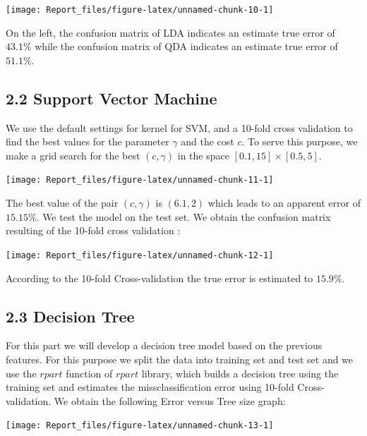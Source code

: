 \documentclass[]{article}
\begin{document}
\begin{center}\texttt{[image: Report\_files/figure-latex/unnamed-chunk-10-1]} \end{center}

On the left, the confusion matrix of LDA indicates an estimate true
error of \(43.1\%\) while the confusion matrix of QDA indicates an
estimate true error of \(51.1\%\).

\subsection{2.2 Support Vector Machine}\label{support-vector-machine}

We use the default settings for kernel for SVM, and a 10-fold cross
validation to find the best values for the parameter \(\gamma\) and the
cost \(c\). To serve this purpose, we make a grid search for the best
\((c,\gamma)\) in the space \([0.1,15] \times [0.5,5]\).

\begin{center}\texttt{[image: Report\_files/figure-latex/unnamed-chunk-11-1]} \end{center}

The best value of the pair \((c,\gamma)\) is \((6.1,2)\) which leads to
an apparent error of \(15.15\%\). We test the model on the test set. We
obtain the confusion matrix resulting of the 10-fold cross validation :

\begin{center}\texttt{[image: Report\_files/figure-latex/unnamed-chunk-12-1]} \end{center}

According to the 10-fold Cross-validation the true error is estimated to
\(15.9\%\).

\subsection{2.3 Decision Tree}\label{decision-tree}

For this part we will develop a decision tree model based on the
previous features. For this purpose we split the data into training set
and test set and we use the \(rpart\) function of \(rpart\) library,
which builds a decision tree using the training set and estimates the
missclassification error using 10-fold Cross-validation. We obtain the
following Error versus Tree size graph:

\begin{center}\texttt{[image: Report\_files/figure-latex/unnamed-chunk-13-1]} \end{center}
\end{document}
